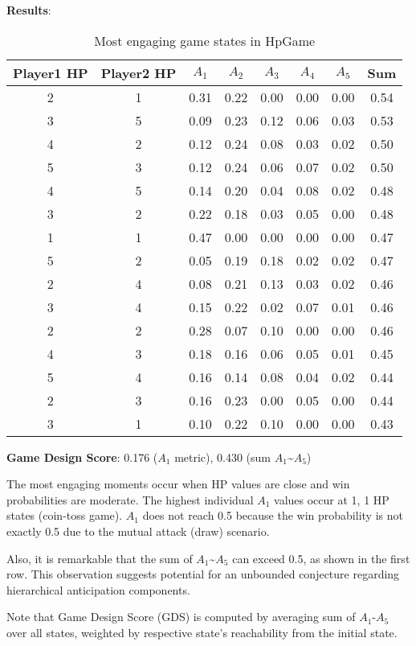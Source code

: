 \documentclass{article}
\begin{document}
\textbf{Results}:
\begin{table}[H]
\centering
\begin{tabular}{|c|c|c|c|c|c|c|c|}
\hline
Player1 HP & Player2 HP & $A_1$ & $A_2$ & $A_3$ & $A_4$ & $A_5$ & Sum \\
\hline
2 & 1 & 0.31 & 0.22 & 0.00 & 0.00 & 0.00 & 0.54 \\
3 & 5 & 0.09 & 0.23 & 0.12 & 0.06 & 0.03 & 0.53 \\
4 & 2 & 0.12 & 0.24 & 0.08 & 0.03 & 0.02 & 0.50 \\
5 & 3 & 0.12 & 0.24 & 0.06 & 0.07 & 0.02 & 0.50 \\
4 & 5 & 0.14 & 0.20 & 0.04 & 0.08 & 0.02 & 0.48 \\
3 & 2 & 0.22 & 0.18 & 0.03 & 0.05 & 0.00 & 0.48 \\
1 & 1 & 0.47 & 0.00 & 0.00 & 0.00 & 0.00 & 0.47 \\
5 & 2 & 0.05 & 0.19 & 0.18 & 0.02 & 0.02 & 0.47 \\
2 & 4 & 0.08 & 0.21 & 0.13 & 0.03 & 0.02 & 0.46 \\
3 & 4 & 0.15 & 0.22 & 0.02 & 0.07 & 0.01 & 0.46 \\
2 & 2 & 0.28 & 0.07 & 0.10 & 0.00 & 0.00 & 0.46 \\
4 & 3 & 0.18 & 0.16 & 0.06 & 0.05 & 0.01 & 0.45 \\
5 & 4 & 0.16 & 0.14 & 0.08 & 0.04 & 0.02 & 0.44 \\
2 & 3 & 0.16 & 0.23 & 0.00 & 0.05 & 0.00 & 0.44 \\
3 & 1 & 0.10 & 0.22 & 0.10 & 0.00 & 0.00 & 0.43 \\
\hline
\end{tabular}
\caption{Most engaging game states in HpGame}
\end{table}
\textbf{Game Design Score}: 0.176 ($A_1$ metric), 0.430 (sum $A_1$\textasciitilde$A_5$)

The most engaging moments occur when HP values are close and win probabilities are moderate.
The highest individual $A_1$ values occur at 1, 1 HP states (coin-toss game).
$A_1$ does not reach 0.5 because the win probability is not exactly 0.5 due to the mutual attack (draw) scenario.

Also, it is remarkable that the sum of $A_1$\textasciitilde$A_5$ can exceed 0.5, as shown in the first row. This observation suggests potential for an unbounded conjecture regarding hierarchical anticipation components.

Note that Game Design Score (GDS) is computed by averaging sum of $A_1$-$A_5$ over all states, weighted by respective state's reachability from the initial state.
\end{document}
